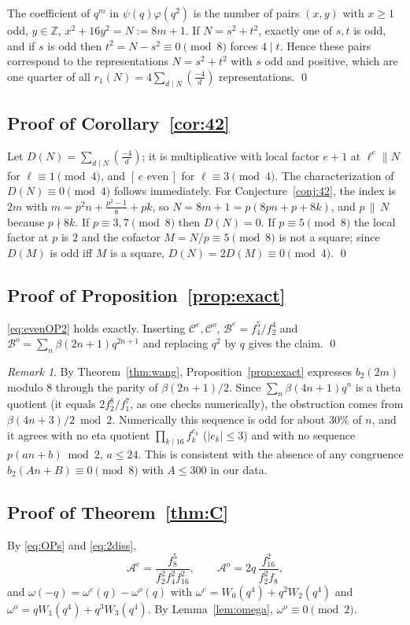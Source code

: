 \documentclass[11pt]{amsart}
\theoremstyle{definition}
\theoremstyle{remark}
\newtheorem{remark}[theorem]{Remark}
\numberwithin{equation}{section}
\newcommand{\Z}{\mathbb{Z}}
\newcommand{\ind}[1]{[\,#1\,]}
\begin{document}
The coefficient of $q^m$ in $\psi(q)\varphi(q^2)$ is the number of pairs $(x,y)$ with $x\ge1$ odd, $y\in\Z$, $x^2+16y^2=N:=8m+1$. If $N=s^2+t^2$, exactly one of $s,t$ is odd, and if $s$ is odd then $t^2=N-s^2\equiv0\pmod 8$ forces $4\mid t$. Hence these pairs correspond to the representations $N=s^2+t^2$ with $s$ odd and positive, which are one quarter of all $r_1(N)=4\sum_{d\mid N}\left(\frac{-4}{d}\right)$ representations. \qed

\subsection{Proof of Corollary~\ref{cor:42}}
Let $D(N)=\sum_{d\mid N}\left(\frac{-4}{d}\right)$; it is multiplicative with local factor $e+1$ at $\ell^e\|N$ for $\ell\equiv1\pmod4$, and $\ind{e\text{ even}}$ for $\ell\equiv3\pmod4$. The characterization of $D(N)\equiv0\pmod4$ follows immediately. For Conjecture~\ref{conj:42}, the index is $2m$ with $m=p^2n+\frac{p^2-1}{8}+pk$, so $N=8m+1=p(8pn+p+8k)$, and $p\,\|\,N$ because $p\nmid 8k$. If $p\equiv3,7\pmod 8$ then $D(N)=0$. If $p\equiv5\pmod 8$ the local factor at $p$ is $2$ and the cofactor $M=N/p\equiv5\pmod 8$ is not a square; since $D(M)$ is odd iff $M$ is a square, $D(N)=2D(M)\equiv0\pmod4$. \qed

\subsection{Proof of Proposition~\ref{prop:exact}}
\eqref{eq:evenOP2} holds exactly. Inserting $\mathcal C^{e},\mathcal C^{o}$, $\mathcal B^{e}=f_4^5/f_2^4$ and $\mathcal B^{o}=\sum_n\beta(2n+1)q^{2n+1}$ and replacing $q^2$ by $q$ gives the claim. \qed

\begin{remark}\label{rem:mod8}
By Theorem~\ref{thm:wang}, Proposition~\ref{prop:exact} expresses $b_2(2m)$ modulo $8$ through the parity of $\beta(2n+1)/2$. Since $\sum_n\beta(4n+1)q^n$ is a theta quotient (it equals $2f_2^8/f_1^7$, as one checks numerically), the obstruction comes from $\beta(4n+3)/2\bmod 2$. Numerically this sequence is odd for about $30\%$ of $n$, and it agrees with no eta quotient $\prod_{k\mid16}f_k^{e_k}$ ($|e_k|\le3$) and with no sequence $p(an+b)\bmod 2$, $a\le 24$. This is consistent with the absence of any congruence $b_2(An+B)\equiv0\pmod 8$ with $A\le300$ in our data.
\end{remark}

\subsection{Proof of Theorem~\ref{thm:C}}
By \eqref{eq:OPs} and \eqref{eq:2diss},
\[
\mathcal A^{e}=\frac{f_8^5}{f_2^2f_4^2f_{16}^2},\qquad \mathcal A^{o}=2q\,\frac{f_{16}^2}{f_2^2f_8},
\]
and $\omega(-q)=\omega^{e}(q)-\omega^{o}(q)$ with $\omega^{e}=W_0(q^4)+q^2W_2(q^4)$ and $\omega^{o}=qW_1(q^4)+q^3W_3(q^4)$. By Lemma~\ref{lem:omega}, $\omega^{o}\equiv0\pmod 2$.
\end{document}
